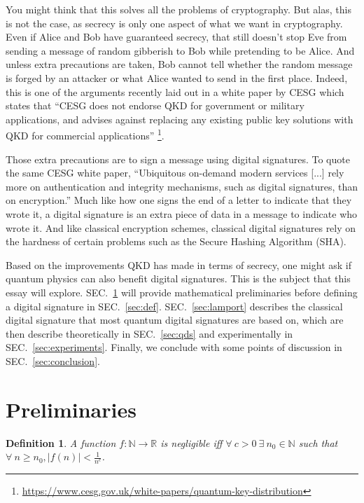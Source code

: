 \documentclass[%
 reprint,
 amsmath,amssymb,
 aps,
 pra,
]{revtex4-1}
\newtheorem{definition}{Definition}[section]
\begin{document}
You might think that this solves all the problems of cryptography. But alas, this is not the case, as secrecy is only one aspect of what we want in cryptography. Even if Alice and Bob have guaranteed secrecy, that still doesn't stop Eve from sending a message of random gibberish to Bob while pretending to be Alice. And unless extra precautions are taken, Bob cannot tell whether the random message is forged by an attacker or what Alice wanted to send in the first place. Indeed, this is one of the arguments recently laid out in a white paper by CESG which states that ``CESG does not endorse QKD for government or military applications, and advises against replacing any existing public key solutions with QKD for commercial applications'' \footnote{\url{https://www.cesg.gov.uk/white-papers/quantum-key-distribution}}.

Those extra precautions are to sign a message using digital signatures. To quote the same CESG white paper, ``Ubiquitous on-demand modern services [...] rely more on authentication and integrity mechanisms, such as digital signatures, than on encryption.'' Much like how one signs the end of a letter to indicate that they wrote it, a digital signature is an extra piece of data in a message to indicate who wrote it. And like classical encryption schemes, classical digital signatures rely on the hardness of certain problems such as the Secure Hashing Algorithm (SHA).

Based on the improvements QKD has made in terms of secrecy, one might ask if quantum physics can also benefit digital signatures. This is the subject that this essay will explore. SEC.\ \ref{sec:prelim} will provide mathematical preliminaries before defining a digital signature in SEC.\ \ref{sec:def}. SEC.\ \ref{sec:lamport} describes the classical digital signature that most quantum digital signatures are based on, which are then describe theoretically in SEC.\ \ref{sec:qds} and experimentally in SEC.\ \ref{sec:experiments}. Finally, we conclude with some points of discussion in SEC.\ \ref{sec:conclusion}.

\section{Preliminaries}
\label{sec:prelim}

\begin{definition}
A function $f:\mathbb{N}\rightarrow\mathbb{R}$ is negligible iff $\forall~ c > 0 ~\exists~ n_0 \in \mathbb{N}$ such that $\forall~ n \geq n_0, |f(n)| < \frac{1}{n^c}$.
\end{definition}
\end{document}
